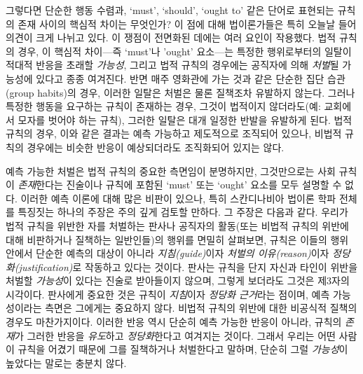 \documentclass[12pt, oneside]{book}  %
\begin{document}
그렇다면 단순한 행동 수렴과, `must', `should', `ought to' 같은 단어로
표현되는 규칙의 존재 사이의 핵심적 차이는 무엇인가? 이 점에 대해
법이론가들은 특히 오늘날 들어 의견이 크게 나뉘고 있다. 이 쟁점이
전면화된 데에는 여러 요인이 작용했다. 법적 규칙의 경우, 이 핵심적
차이---즉 `must'나 'ought' 요소---는 특정한 행위로부터의 일탈이 적대적
반응을 초래할 \emph{가능성}, 그리고 법적 규칙의 경우에는 공직자에 의해
\emph{처벌}될 가능성에 있다고 종종 여겨진다. 반면 매주 영화관에 가는
것과 같은 단순한 집단 습관(group habits)의 경우, 이러한 일탈은 처벌은
물론 질책조차 유발하지 않는다. 그러나 특정한 행동을 요구하는 규칙이
존재하는 경우, 그것이 법적이지 않더라도(예: 교회에서 모자를 벗어야 하는
규칙), 그러한 일탈은 대개 일정한 반발을 유발하게 된다. 법적 규칙의 경우,
이와 같은 결과는 예측 가능하고 제도적으로 조직되어 있으나, 비법적 규칙의
경우에는 비슷한 반응이 예상되더라도 조직화되어 있지는 않다.

예측 가능한 처벌은 법적 규칙의 중요한 측면임이 분명하지만, 그것만으로는
사회 규칙이 \emph{존재}한다는 진술이나 규칙에 포함된 `must' 또는 `ought'
요소를 모두 설명할 수 없다. 이러한 예측 이론에 대해 많은 비판이 있으나,
특히 스칸디나비아 법이론 학파 전체를 특징짓는 하나의 주장은 주의 깊게
검토할 만하다. 그 주장은 다음과 같다. 우리가 법적 규칙을 위반한 자를
처벌하는 판사나 공직자의 활동(또는 비법적 규칙의 위반에 대해 비판하거나
질책하는 일반인들)의 행위를 면밀히 살펴보면, 규칙은 이들의 행위 안에서
단순한 예측의 대상이 아니라 \emph{지침(guide)}이자 \emph{처벌의
이유(reason)}이자 \emph{정당화(justification)}로 작동하고 있다는 것이다.
판사는 규칙을 단지 자신과 타인이 위반을 처벌할 \emph{가능성}이 있다는
진술로 받아들이지 않으며, 그렇게 보더라도 그것은 제3자의 시각이다.
판사에게 중요한 것은 규칙이 \emph{지침}이자 \emph{정당화 근거}라는
점이며, 예측 가능성이라는 측면은 그에게는 중요하지 않다. 비법적 규칙의
위반에 대한 비공식적 질책의 경우도 마찬가지이다. 이러한 반응 역시 단순히
예측 가능한 반응이 아니라, 규칙의 \emph{존재}가 그러한 반응을
\emph{유도}하고 \emph{정당화}한다고 여겨지는 것이다. 그래서 우리는 어떤
사람이 규칙을 어겼기 때문에 그를 질책하거나 처벌한다고 말하며, 단순히
그럴 \emph{가능성}이 높았다는 말로는 충분치 않다.
\end{document}
